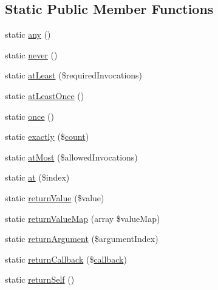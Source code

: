 \subsection*{Static Public Member Functions}
\begin{DoxyCompactItemize}
\item 
static \mbox{\hyperlink{class_p_h_p_unit___framework___test_case_a8347b85f5dc642279e508472941836f2}{any}} ()
\item 
static \mbox{\hyperlink{class_p_h_p_unit___framework___test_case_a97a51ceea8513ec3c48d2a5c3b85fdfb}{never}} ()
\item 
static \mbox{\hyperlink{class_p_h_p_unit___framework___test_case_ac9adbbd8ea3a417a40d8a37f15876e33}{at\+Least}} (\$required\+Invocations)
\item 
static \mbox{\hyperlink{class_p_h_p_unit___framework___test_case_a990434dbc71ecbf7c834b05bcf836ab8}{at\+Least\+Once}} ()
\item 
static \mbox{\hyperlink{class_p_h_p_unit___framework___test_case_a0a4754041df65e1fc4fbf69b8640cc70}{once}} ()
\item 
static \mbox{\hyperlink{class_p_h_p_unit___framework___test_case_a52f1a82773310a14023baedaa99a1615}{exactly}} (\$\mbox{\hyperlink{class_p_h_p_unit___framework___test_case_ac751e87b3d4c4bf2feb03bee8b092755}{count}})
\item 
static \mbox{\hyperlink{class_p_h_p_unit___framework___test_case_aba87fba0064359677a16ca2c1fd59c7c}{at\+Most}} (\$allowed\+Invocations)
\item 
static \mbox{\hyperlink{class_p_h_p_unit___framework___test_case_ac735019234bfd368eb87cae030d77593}{at}} (\$index)
\item 
static \mbox{\hyperlink{class_p_h_p_unit___framework___test_case_a499db61d9a3d9d1169f1c7ca83c0f27b}{return\+Value}} (\$value)
\item 
static \mbox{\hyperlink{class_p_h_p_unit___framework___test_case_a618d8515dffaa12e45eb4b849b2ea414}{return\+Value\+Map}} (array \$value\+Map)
\item 
static \mbox{\hyperlink{class_p_h_p_unit___framework___test_case_a8c6fc29a4fa7ac8606712d11a76f00c3}{return\+Argument}} (\$argument\+Index)
\item 
static \mbox{\hyperlink{class_p_h_p_unit___framework___test_case_ac10127c2bf64242fb66a6d53fa94723b}{return\+Callback}} (\$\mbox{\hyperlink{class_p_h_p_unit___framework___assert_a9071a07cb9c8a581f500c46731151b0a}{callback}})
\item 
static \mbox{\hyperlink{class_p_h_p_unit___framework___test_case_a2aaa059e6e724a0cb012d1186006491c}{return\+Self}} ()

\end{DoxyCompactItemize}
